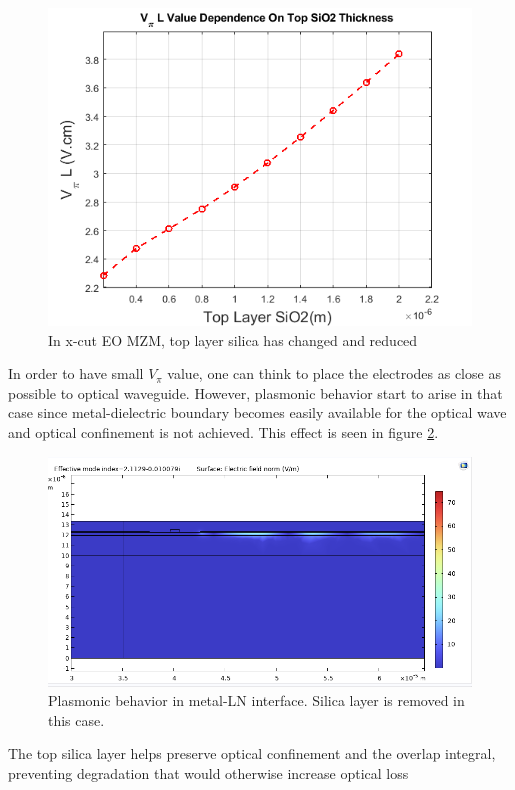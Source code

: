     \begin{figure}[h]
        \centering
        \includegraphics[width=0.75\linewidth]{overlap_updated_v_piL-top_sio2.png}
        \caption{In x-cut EO MZM, top layer silica has changed and reduced }
        \label{fig:voltage-top-silica-dependence}
    \end{figure}

    In order to have small $V_\pi$ value, one can think to place the electrodes as close as possible to optical waveguide. However, plasmonic behavior start to arise in that case since metal-dielectric boundary becomes easily available for the optical wave and optical confinement is not achieved. This effect is seen in figure \ref{fig:x-cut-plasmonics}.

    \begin{figure}[h]
        \centering
        \includegraphics[width=0.7\linewidth]{loss_try.PNG}
        \caption{Plasmonic behavior in metal-LN interface. Silica layer is removed in this case.}
        \label{fig:x-cut-plasmonics}
    \end{figure}

    The top silica layer helps preserve optical confinement and the overlap integral, preventing degradation that would otherwise increase optical loss 

